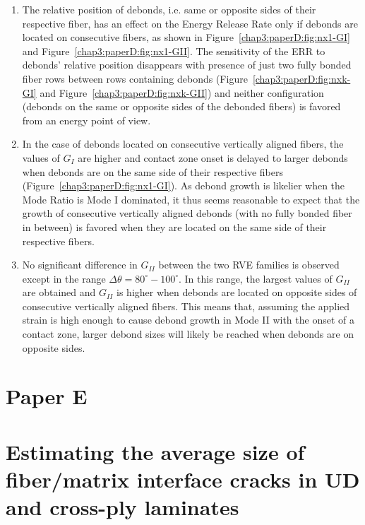 \begin{enumerate}
\item The relative position of debonds, i.e. same or opposite sides of their respective fiber, has an effect on the Energy Release Rate only if debonds are located on consecutive fibers, as shown in Figure~\ref{chap3:paperD:fig:nx1-GI} and Figure~\ref{chap3:paperD:fig:nx1-GII}. The sensitivity of the ERR to debonds' relative position disappears with presence of just two fully bonded fiber rows between rows containing debonds (Figure~\ref{chap3:paperD:fig:nxk-GI} and Figure~\ref{chap3:paperD:fig:nxk-GII}) and neither configuration (debonds on the same or opposite sides of the debonded fibers) is favored from an energy point of view.
\item In the case of debonds located on consecutive vertically aligned fibers, the values of $G_{I}$ are higher and contact zone onset is delayed to larger debonds when debonds are on the same side of their respective fibers (Figure~\ref{chap3:paperD:fig:nx1-GI}). As debond growth is likelier when the Mode Ratio is Mode I dominated, it thus seems reasonable to expect that the growth of consecutive vertically aligned debonds (with no fully bonded fiber in between) is favored when they are located on the same side of their respective fibers.
\item No significant difference in $G_{II}$ between the two RVE families is observed except in the range $\Delta\theta=80^{\circ}-100^{\circ}$. In this range, the largest values of $G_{II}$ are obtained and $G_{II}$ is higher when debonds are located on opposite sides of consecutive vertically aligned fibers. This means that, assuming the applied strain is high enough to cause debond growth in Mode II with the onset of a contact zone, larger debond sizes will likely be reached when debonds are on opposite sides.
\end{enumerate}

\section{Paper E}\label{chap3:paperE}
\section*{Estimating the average size of fiber/matrix interface cracks in UD and cross-ply laminates}

